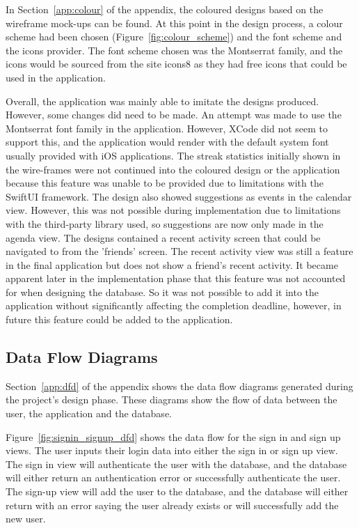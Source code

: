         In Section~\ref{app:colour} of the appendix, the coloured designs based on the wireframe mock-ups can be found.  At this point in the design process, a colour scheme had been chosen (Figure~\ref{fig:colour_scheme}) and the font scheme and the icons provider.  The font scheme chosen was the Montserrat family, and the icons would be sourced from the site icons8 as they had free icons that could be used in the application.
        
        
        
        Overall, the application was mainly able to imitate the designs produced. However, some changes did need to be made.  An attempt was made to use the Montserrat font family in the application. However, XCode did not seem to support this, and the application would render with the default system font usually provided with iOS applications.  The streak statistics initially shown in the wire-frames were not continued into the coloured design or the application because this feature was unable to be provided due to limitations with the SwiftUI framework. The design also showed suggestions as events in the calendar view. However, this was not possible during implementation due to limitations with the third-party library used, so suggestions are now only made in the agenda view.  The designs contained a recent activity screen that could be navigated to from the 'friends' screen.  The recent activity view was still a feature in the final application but does not show a friend's recent activity.  It became apparent later in the implementation phase that this feature was not accounted for when designing the database. So it was not possible to add it into the application without significantly affecting the completion deadline, however, in future this feature could be added to the application.
        
        \subsection{Data Flow Diagrams}
        \label{subsec:DFD}
        Section~\ref{app:dfd} of the appendix shows the data flow diagrams generated during the project's design phase.  These diagrams show the flow of data between the user, the application and the database.  
        
        Figure~\ref{fig:signin_signup_dfd} shows the data flow for the sign in and sign up views.  The user inputs their login data into either the sign in or sign up view.  The sign in view will authenticate the user with the database, and the database will either return an authentication error or successfully authenticate the user.  The sign-up view will add the user to the database, and the database will either return with an error saying the user already exists or will successfully add the new user.
        
